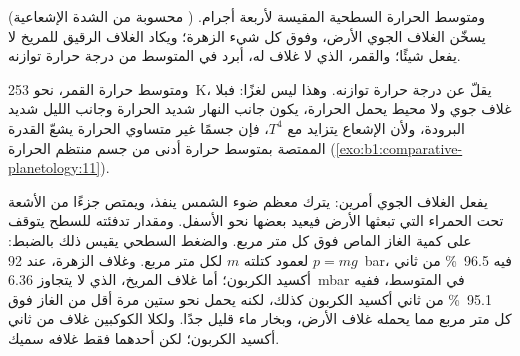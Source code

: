 \begin{omfigure}

{\small {} (محسوبة من الشدة الإشعاعية ) ومتوسط الحرارة السطحية المقيسة لأربعة أجرام. يسخّن الغلاف الجوي الأرض، وفوق كل شيء الزهرة؛ ويكاد الغلاف الرقيق للمريخ لا يفعل شيئًا؛ والقمر، الذي لا غلاف له، أبرد في المتوسط من درجة حرارة توازنه.}
\end{omfigure}

ومتوسط حرارة القمر، نحو \qty{253}{K}، يقلّ عن درجة حرارة توازنه. وهذا ليس لغزًا: فبلا غلاف جوي ولا محيط يحمل الحرارة، يكون جانب النهار شديد الحرارة وجانب الليل شديد البرودة، ولأن الإشعاع يتزايد مع $T^4$، فإن جسمًا غير متساوي الحرارة يشعّ القدرة الممتصة بمتوسط حرارة أدنى من جسم منتظم الحرارة (\cref{exo:b1:comparative-planetology:11}).

يفعل الغلاف الجوي أمرين: يترك معظم ضوء الشمس ينفذ، ويمتص جزءًا من الأشعة تحت الحمراء التي تبعثها الأرض فيعيد بعضها نحو الأسفل. ومقدار تدفئته للسطح يتوقف على كمية الغاز الماص فوق كل متر مربع. والضغط السطحي يقيس ذلك بالضبط: $p = mg$ لعمود كتلته $m$ لكل متر مربع. وغلاف الزهرة، عند \qty{92}{bar}، فيه \qty{96.5}{\percent} من ثاني أكسيد الكربون؛ أما غلاف المريخ، الذي لا يتجاوز \qty{6.36}{mbar} في المتوسط، ففيه \qty{95.1}{\percent} من ثاني أكسيد الكربون كذلك، لكنه يحمل نحو ستين مرة أقل من الغاز فوق كل متر مربع مما يحمله غلاف الأرض، وبخار ماء قليل جدًا. ولكلا الكوكبين غلاف من ثاني أكسيد الكربون؛ لكن أحدهما فقط غلافه سميك.

